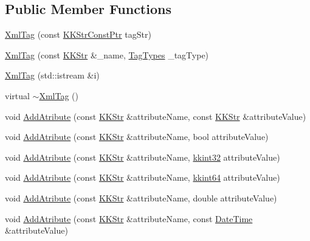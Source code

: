 \subsection*{Public Member Functions}
\begin{DoxyCompactItemize}
\item 
\hyperlink{class_k_k_b_1_1_xml_tag_a4fc615bc59f6dc243f19148a15839710}{Xml\+Tag} (const \hyperlink{namespace_k_k_b_a46f665ec17615c856eff3d21f78bed5c}{K\+K\+Str\+Const\+Ptr} tag\+Str)
\item 
\hyperlink{class_k_k_b_1_1_xml_tag_a59e8ab5dd5bb9e4ae233e222171b4c7b}{Xml\+Tag} (const \hyperlink{class_k_k_b_1_1_k_k_str}{K\+K\+Str} \&\+\_\+name, \hyperlink{class_k_k_b_1_1_xml_tag_a6c0ef0e23f982f49d55d4fb7eaff6ac9}{Tag\+Types} \+\_\+tag\+Type)
\item 
\hyperlink{class_k_k_b_1_1_xml_tag_aafdbac20c27fc1cda98f4d0e77c490c0}{Xml\+Tag} (std\+::istream \&i)
\item 
virtual \hyperlink{class_k_k_b_1_1_xml_tag_abbb5fef8e3d0dc433a6aaaf88a821d2f}{$\sim$\+Xml\+Tag} ()
\item 
void \hyperlink{class_k_k_b_1_1_xml_tag_a169ba62b2b75ad1b54332d9ce5eb0568}{Add\+Atribute} (const \hyperlink{class_k_k_b_1_1_k_k_str}{K\+K\+Str} \&attribute\+Name, const \hyperlink{class_k_k_b_1_1_k_k_str}{K\+K\+Str} \&attribute\+Value)
\item 
void \hyperlink{class_k_k_b_1_1_xml_tag_a2643b3019d0c8cebdd578882ffa899ec}{Add\+Atribute} (const \hyperlink{class_k_k_b_1_1_k_k_str}{K\+K\+Str} \&attribute\+Name, bool attribute\+Value)
\item 
void \hyperlink{class_k_k_b_1_1_xml_tag_aa593d243bb281b07ba8a1ea7d7f52c5e}{Add\+Atribute} (const \hyperlink{class_k_k_b_1_1_k_k_str}{K\+K\+Str} \&attribute\+Name, \hyperlink{namespace_k_k_b_a8fa4952cc84fda1de4bec1fbdd8d5b1b}{kkint32} attribute\+Value)
\item 
void \hyperlink{class_k_k_b_1_1_xml_tag_a31e8900649ba1229371460afbdf85e66}{Add\+Atribute} (const \hyperlink{class_k_k_b_1_1_k_k_str}{K\+K\+Str} \&attribute\+Name, \hyperlink{namespace_k_k_b_aa3486b1c5ea9162b3b020c69f72826eb}{kkint64} attribute\+Value)
\item 
void \hyperlink{class_k_k_b_1_1_xml_tag_a109d4043b0b87413bc38b0bd9c08984c}{Add\+Atribute} (const \hyperlink{class_k_k_b_1_1_k_k_str}{K\+K\+Str} \&attribute\+Name, double attribute\+Value)
\item 
void \hyperlink{class_k_k_b_1_1_xml_tag_a4d1332cd54aeae8c583f3cd14abac674}{Add\+Atribute} (const \hyperlink{class_k_k_b_1_1_k_k_str}{K\+K\+Str} \&attribute\+Name, const \hyperlink{class_k_k_b_1_1_date_time}{Date\+Time} \&attribute\+Value)

\end{DoxyCompactItemize}
